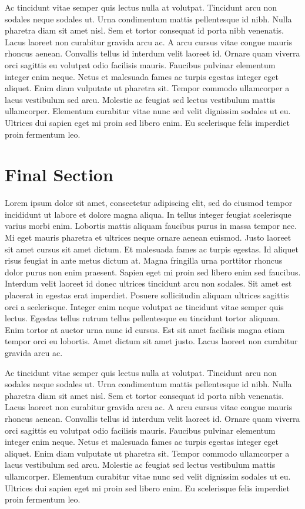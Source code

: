 \documentclass{article}
\begin{document}
Ac tincidunt vitae semper quis lectus nulla at volutpat. Tincidunt arcu non sodales neque sodales ut. Urna condimentum mattis pellentesque id nibh. Nulla pharetra diam sit amet nisl. Sem et tortor consequat id porta nibh venenatis. Lacus laoreet non curabitur gravida arcu ac. A arcu cursus vitae congue mauris rhoncus aenean. Convallis tellus id interdum velit laoreet id. Ornare quam viverra orci sagittis eu volutpat odio facilisis mauris. Faucibus pulvinar elementum integer enim neque. Netus et malesuada fames ac turpis egestas integer eget aliquet. Enim diam vulputate ut pharetra sit. Tempor commodo ullamcorper a lacus vestibulum sed arcu. Molestie ac feugiat sed lectus vestibulum mattis ullamcorper. Elementum curabitur vitae nunc sed velit dignissim sodales ut eu. Ultrices dui sapien eget mi proin sed libero enim. Eu scelerisque felis imperdiet proin fermentum leo.\newline



\section{Final Section}

Lorem ipsum dolor sit amet, consectetur adipiscing elit, sed do eiusmod tempor incididunt ut labore et dolore magna aliqua. In tellus integer feugiat scelerisque varius morbi enim. Lobortis mattis aliquam faucibus purus in massa tempor nec. Mi eget mauris pharetra et ultrices neque ornare aenean euismod. Justo laoreet sit amet cursus sit amet dictum. Et malesuada fames ac turpis egestas. Id aliquet risus feugiat in ante metus dictum at. Magna fringilla urna porttitor rhoncus dolor purus non enim praesent. Sapien eget mi proin sed libero enim sed faucibus. Interdum velit laoreet id donec ultrices tincidunt arcu non sodales. Sit amet est placerat in egestas erat imperdiet. Posuere sollicitudin aliquam ultrices sagittis orci a scelerisque. Integer enim neque volutpat ac tincidunt vitae semper quis lectus. Egestas tellus rutrum tellus pellentesque eu tincidunt tortor aliquam. Enim tortor at auctor urna nunc id cursus. Est sit amet facilisis magna etiam tempor orci eu lobortis. Amet dictum sit amet justo. Lacus laoreet non curabitur gravida arcu ac.

Ac tincidunt vitae semper quis lectus nulla at volutpat. Tincidunt arcu non sodales neque sodales ut. Urna condimentum mattis pellentesque id nibh. Nulla pharetra diam sit amet nisl. Sem et tortor consequat id porta nibh venenatis. Lacus laoreet non curabitur gravida arcu ac. A arcu cursus vitae congue mauris rhoncus aenean. Convallis tellus id interdum velit laoreet id. Ornare quam viverra orci sagittis eu volutpat odio facilisis mauris. Faucibus pulvinar elementum integer enim neque. Netus et malesuada fames ac turpis egestas integer eget aliquet. Enim diam vulputate ut pharetra sit. Tempor commodo ullamcorper a lacus vestibulum sed arcu. Molestie ac feugiat sed lectus vestibulum mattis ullamcorper. Elementum curabitur vitae nunc sed velit dignissim sodales ut eu. Ultrices dui sapien eget mi proin sed libero enim. Eu scelerisque felis imperdiet proin fermentum leo.
\end{document}
